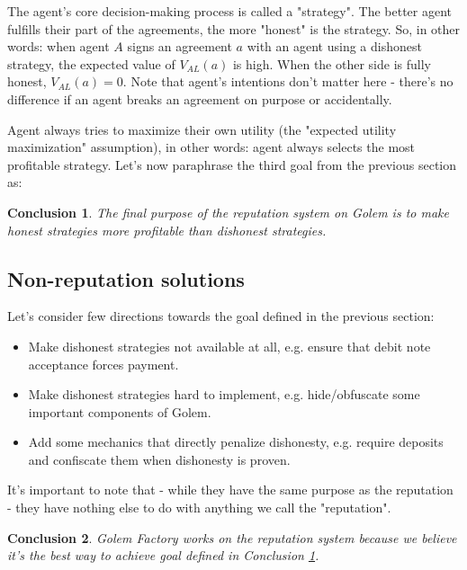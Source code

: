 \documentclass{article}
\newtheorem{conclusion}{Conclusion}[section]
\begin{document}
The agent's core decision-making process is called a "strategy". The better agent fulfills their part of the agreements, the more "honest" is the strategy.
So, in other words: when agent $A$ signs an agreement $a$ with an agent using a dishonest strategy, the expected value of $V_{AL}(a)$ is high.
When the other side is fully honest, $V_{AL}(a) = 0$. 
Note that agent's intentions don't matter here - there's no difference if an agent breaks an agreement on purpose or accidentally.
 
Agent always tries to maximize their own utility (the "expected utility maximization" assumption), in other words: agent always selects the most profitable strategy.
Let's now paraphrase the third goal from the previous section as:

\begin{conclusion}

The final purpose of the reputation system on Golem is to make honest strategies more profitable than dishonest strategies.

\label{main purpose conclusion}
\end{conclusion}


\subsection{Non-reputation solutions}

Let's consider few directions towards the goal defined in the previous section:

\begin{itemize}
\item Make dishonest strategies not available at all, e.g. ensure that debit note acceptance forces payment.
\item Make dishonest strategies hard to implement, e.g. hide/obfuscate some important components of Golem.
\item Add some mechanics that directly penalize dishonesty, e.g. require deposits and confiscate them when dishonesty is proven.
\end{itemize}

It's important to note that - while they have the same purpose as the reputation - they have nothing else to do with anything we call the "reputation".

\begin{conclusion}
Golem Factory works on the reputation system because we believe it's the best way to achieve goal defined in Conclusion \ref{main purpose conclusion}.
\end{conclusion}
\end{document}
